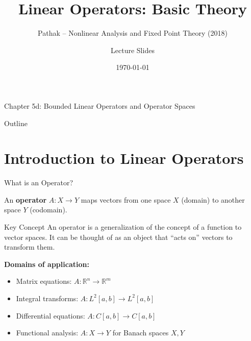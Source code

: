 \documentclass[aspectratio=169,10pt]{beamer}
\title{Linear Operators: Basic Theory}
\subtitle{Pathak -- Nonlinear Analysis and Fixed Point Theory (2018)}
\author{Lecture Slides}
\date{\today}
\begin{document}
\begin{frame}
    \titlepage
    \vspace{-1cm}
    {\small Chapter 5d: Bounded Linear Operators and Operator Spaces}
\end{frame}

\begin{frame}{Outline}
    \tableofcontents
\end{frame}

\section{Introduction to Linear Operators}

\begin{frame}{What is an Operator?}
    \begin{definition}
        An \textbf{operator} $A : X \to Y$ maps vectors from one space $X$ (domain) to another space $Y$ (codomain).
    \end{definition}

    \vspace{0.5cm}

    \begin{block}{Key Concept}
        An operator is a generalization of the concept of a function to vector spaces. It can be thought of as an object that ``acts on'' vectors to transform them.
    \end{block}

    \vspace{0.5cm}

    \textbf{Domains of application:}
    \begin{itemize}
        \item Matrix equations: $A : \mathbb{R}^n \to \mathbb{R}^m$
        \item Integral transforms: $A : L^2[a,b] \to L^2[a,b]$
        \item Differential equations: $A : C[a,b] \to C[a,b]$
        \item Functional analysis: $A : X \to Y$ for Banach spaces $X, Y$
    \end{itemize}
\end{frame}
\end{document}
